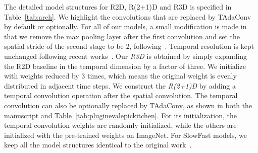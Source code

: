 \documentclass[10pt,journal,compsoc]{IEEEtran}
\begin{document}
The detailed model structures for R2D, R(2+1)D and R3D is specified in Table~\ref{tab:arch}. 
We highlight the convolutions that are replaced by TAdaConv by default or optionally.
For all of our models, a small modification is made in that we remove the max pooling layer after the first convolution and set the spatial stride of the second stage to be 2, following~\cite{corrnet}. 
Temporal resolution is kept unchanged following recent works~\cite{slowfast,tea,stm}. 
Our \textit{R3D} is obtained by simply expanding the R2D baseline in the temporal dimension by a factor of three. 
We initialize with weights reduced by 3 times, which means the original weight is evenly distributed in adjacent time steps.
We construct the \textit{R(2+1)D} by adding a temporal convolution operation after the spatial convolution. 
The temporal convolution can also be optionally replaced by TAdaConv, as shown in both the manuscript and Table~\ref{tab:pluginevalepickitchen}.
For its initialization, the temporal convolution weights are randomly initialized, while the others are initialized with the pre-trained weights on ImageNet.
For SlowFast models, we keep all the model structures identical to the original work~\cite{slowfast}.
\end{document}
